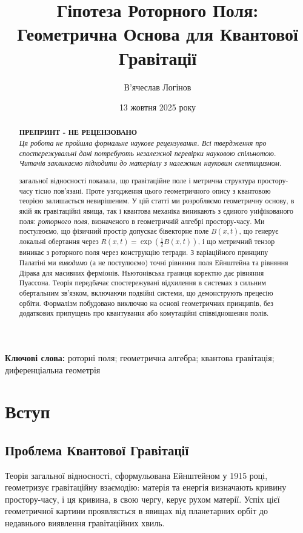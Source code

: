 \documentclass[11pt,a4paper]{article}
\title{Гіпотеза Роторного Поля: Геометрична Основа для Квантової Гравітації}
\author[1]{В'ячеслав Логінов}
\affil[1]{Київ, Україна\\ \texttt{barthez.slavik@gmail.com}}
\date{13 жовтня 2025 року}
\numberwithin{equation}{section}
\theoremstyle{plain}
\theoremstyle{definition}
\theoremstyle{remark}
\newcommand{\keywords}{\textbf{Ключові слова:} роторні поля; геометрична алгебра; квантова гравітація; диференціальна геометрія}
\begin{document}
\maketitle

\begin{abstract}
\noindent
\textbf{ПРЕПРИНТ - НЕ РЕЦЕНЗОВАНО}\\
\textit{Ця робота не пройшла формальне наукове рецензування. Всі твердження про спостережувальні дані потребують незалежної перевірки науковою спільнотою. Читачів закликаємо підходити до матеріалу з належним науковим скептицизмом.}

\medskip
{} загальної відносності показала, що гравітаційне поле і метрична структура простору-часу тісно пов'язані. Проте узгодження цього геометричного опису з квантовою теорією залишається невирішеним. У цій статті ми розробляємо геометричну основу, в якій як гравітаційні явища, так і квантова механіка виникають з єдиного уніфікованого поля: \emph{роторного поля}, визначеного в геометричній алгебрі простору-часу. Ми постулюємо, що фізичний простір допускає бівекторне поле $B(x,t)$, що генерує локальні обертання через $R(x,t)=\exp(\frac{1}{2}B(x,t))$, і що метричний тензор виникає з роторного поля через конструкцію тетради. З варіаційного принципу Палатіні ми \emph{виводимо} (а не постулюємо) точні рівняння поля Ейнштейна та рівняння Дірака для масивних ферміонів. Ньютонівська границя коректно дає рівняння Пуассона. Теорія передбачає спостережувані відхилення в системах з сильним обертальним зв'язком, включаючи подвійні системи, що демонструють прецесію орбіти. Формалізм побудовано виключно на основі геометричних принципів, без додаткових припущень про квантування або комутаційні співвідношення полів.
\end{abstract}

\keywords

\section{Вступ}
\label{sec:intro}

\subsection{Проблема Квантової Гравітації}

Теорія загальної відносності, сформульована Ейнштейном у 1915 році, геометризує гравітаційну взаємодію: матерія та енергія визначають кривину простору-часу, і ця кривина, в свою чергу, керує рухом матерії. Успіх цієї геометричної картини проявляється в явищах від планетарних орбіт до недавнього виявлення гравітаційних хвиль.
\end{document}
